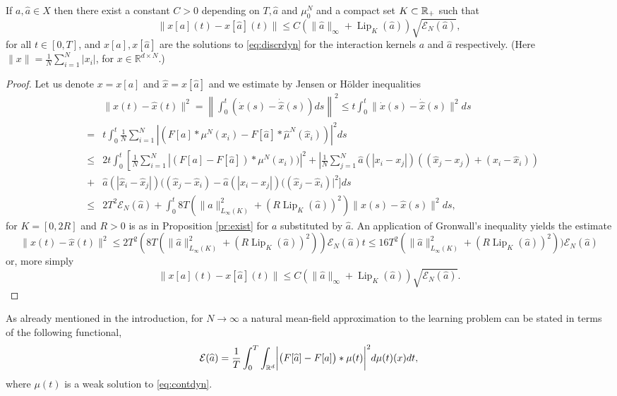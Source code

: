 \begin{proposition}\label{trajapprox}
If $a,\widehat a \in X$ then there exist a constant $C>0$ depending on $T,\widehat a$ and $\mu_0^N$ and a compact set $K \subset \mathbb{R}_+$ such that
\begin{equation}\label{eq:trajapprox}
\| x[a](t) -x[\widehat a](t) \| \leq C (\|\widehat a\|_\infty + \operatorname{Lip}_K(\widehat a)) \sqrt{\mathcal E_N(\widehat a)}, 
\end{equation}
for all $t \in [0,T]$, and $x[a], x[\widehat a]$ are the solutions to \eqref{eq:discrdyn} for the interaction kernels $a$ and $\widehat a$ respectively. (Here $\| x \| = \frac{1}{N} \sum_{i=1}^N |x_i|$, for $x \in \mathbb R^{d \times N}$.)
\end{proposition}
\begin{proof}
Let us denote $x=x[a]$ and $\widehat x =x[\widehat a]$ and we estimate by Jensen or H\"older inequalities
\begin{eqnarray*}
&&\|x(t) - \widehat x(t) \|^2 = \left \| \int_0^t ( \dot x(s) - \dot{\widehat x}(s)) ds \right \|^2  \leq  t \int_0^t \| \dot x(s) - \dot{\widehat x}(s) \|^2 ds \\
&=&  t \int_0^t \frac{1}{N} \sum_{i=1}^N \left | (F[a] * \mu^N(x_i)- F[\widehat a] * \widehat \mu^N(\widehat x_i)) \right |^2 ds\\
&\leq&2 t \int_0^t \left [  \frac{1}{N} \sum_{i=1}^N \left | (F[a] - F[\widehat a]) *  \mu^N( x_i)) \right |^2 +\left | \frac{1}{N} \sum_{j=1}^N \widehat a(|x_i-x_j|)( (\widehat x_j - x_j) + (x_i-\widehat x_i)) \right . \right .  \\
&+& \widehat a(| \widehat x_i-\widehat x_j|)( (\widehat x_j - \widehat x_i) -  \widehat a(| x_i- x_j |)( (\widehat x_j - \widehat x_i) \Big |^2  \Big ] ds \\
&\leq &2 T^2 \mathcal E_N(\widehat a) +  \int_0^t 8 T( \|\widehat a\|_{L_\infty(K)}^2 + (R \operatorname{Lip}_K(\widehat a) ) ^2 )\|x(s) - \widehat x(s) \|^2  ds,
\end{eqnarray*}
for $K=[0,2 R]$ and $R>0$ is as in Proposition \ref{pr:exist} for $a$ substituted by $\widehat a$.
An application of Gronwall's inequality yields the estimate
$$
\|x(t) - \widehat x(t) \|^2 \leq 2 T^2 (8 T( \|\widehat a\|_{L_\infty(K)}^2 + (R \operatorname{Lip}_K(\widehat a) ) ^2 ))  \mathcal E_N(\widehat a) t \leq 16 T^2 ( \|\widehat a\|_{L_\infty(K)}^2 + (R \operatorname{Lip}_K(\widehat a) ) ^2 )) \mathcal E_N(\widehat a) 
$$
or, more simply
$$
\| x[a](t) -x[\widehat a](t) \| \leq C (\|\widehat a\|_{\infty} + \operatorname{Lip}_K(\widehat a)) \sqrt{\mathcal E_N(\widehat a)}.
$$
\end{proof}
As already mentioned in the introduction, for $N \to \infty$ a natural mean-field approximation to the learning problem can be stated in terms of the following functional,
\begin{align*}
	\mathcal E(\widehat a)=\frac{1}{T}\int_0^T \int_{\mathbb{R}^d} \biggl|\bigl(F[\widehat a]-F[a]\bigr)\ast\mu(t)\biggr|^2d\mu(t)(x)dt,
\end{align*}
where $\mu(t)$ is a weak solution to \eqref{eq:contdyn}. 

